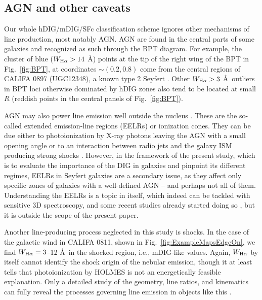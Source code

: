 \documentclass[a4paper, fleqn, usenatbib, useAMS]{mnras}
\newcommand{\Ha}{\ifmmode {\rm H}\alpha \else H$\alpha$\fi\xspace}
\begin{document}
\subsection{AGN and other caveats}
\label{sec:Caveats}

Our whole hDIG/mDIG/SFc classification scheme ignores other mechanisms of line production, most notably AGN. AGN are found in the central parts of some galaxies and recognized as such through the BPT diagram. For example, the cluster of blue ($W_{\Ha} > 14$ \AA) points at the tip of the right wing of the BPT in Fig.\ \ref{fig:BPT}, at coordinates $\sim (0.2,0.8)$ come from the central regions of CALIFA 0897 (UGC12348),  a known type 2 Seyfert \citep{Cusumano.etal.2010, Asmus.etal.2014}. Other $W_{\Ha} > 3$ \AA\ outliers in BPT loci otherwise dominated by hDIG zones also tend to be located at small $R$ (reddish points in the central panels of Fig.\ \ref{fig:BPT}).

AGN may also power line emission well outside the nucleus \citep[up to distances as large as 20 kpc;][]{Veilleux.etal.2003}. These are the so-called extended emission-line regions (EELRs) or ionization cones. They can be due either to photoionization by X-ray photons leaving the AGN with a small opening angle or to an interaction between radio jets and the galaxy ISM producing strong shocks \citep{Wilson.1996}. However, in the framework of the present study, which is to evaluate the importance of the DIG in galaxies and pinpoint its different regimes, EELRs in Seyfert galaxies are a secondary issue, as they affect only specific zones of galaxies with a well-defined AGN -- and perhaps not all of them. Understanding the EELRs is a topic in itself, which indeed can be tackled with sensitive 3D spectroscopy, and some recent studies already started doing so \citep[e.g.,][]{Dopita.etal.2014}, but it is outside the scope of the present paper.

Another line-producing process neglected in this study is shocks. In the case of the galactic wind in CALIFA 0811, shown in Fig.\ \ref{fig:ExampleMapsEdgeOn}, we find $W_{\Ha} = 3$--12 \AA\ in the shocked region, i.e., mDIG-like values. Again, $W_{\Ha}$ by itself cannot identify the shock origin of the nebular emission, though it at least tells that photoionization by HOLMES is not an energetically feasible explanation. Only a detailed study of the geometry, line ratios, and kinematics can fully reveal the processes governing line emission in objects like this \citep{Kreckel.etal.2014, Beirao.etal.2015, LopezCoba.etal.2017}.
\end{document}
